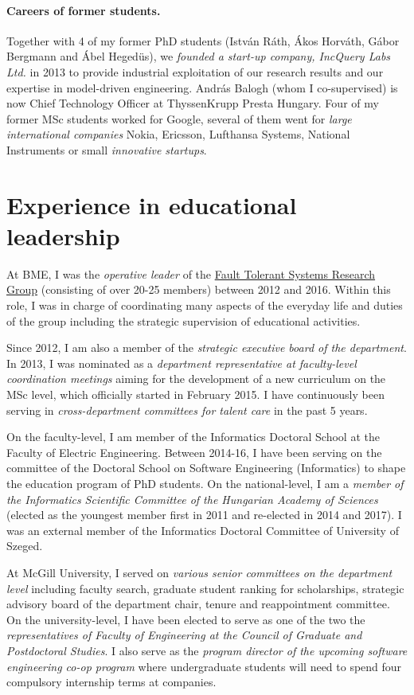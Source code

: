 \documentclass[a4paper,11pt]{article}
\begin{document}
\paragraph{Careers of former students.} Together with 4 of my former PhD students (István Ráth, Ákos Horváth, Gábor Bergmann and Ábel Hegedüs), we \emph{founded a start-up company, IncQuery Labs Ltd.} in 2013 to provide industrial exploitation of our research results and our expertise in model-driven engineering. András Balogh (whom I co-supervised) is now Chief Technology Officer at ThyssenKrupp Presta Hungary. Four of my former MSc students worked for Google, several of them went for \emph{large international companies} Nokia, Ericsson, Lufthansa Systems, National Instruments or small \emph{innovative startups}.

\section{Experience in educational leadership}
At BME, I was the \emph{operative leader} of the \href{http://inf.mit.bme.hu/en/}{Fault Tolerant Systems Research Group} (consisting of over 20-25 members) between 2012 and 2016. Within this role, I was in charge of coordinating many aspects of the everyday life and duties of the group including the strategic supervision of educational activities. 

Since 2012, I am also a member of the \emph{strategic executive board of the department}. In 2013, I was nominated as a \emph{department representative at faculty-level coordination meetings} aiming for the development of a new curriculum on the MSc level, which officially started in February 2015. I have continuously been serving in \emph{cross-department committees for talent care} in the past 5 years. 

On the faculty-level, I am member of the Informatics Doctoral School at the Faculty of Electric Engineering. Between 2014-16, I have been serving on the committee of the Doctoral School on Software Engineering (Informatics) to shape the education program of PhD students. On the national-level, I am a \emph{member of the Informatics Scientific Committee of the Hungarian Academy of Sciences} (elected as the youngest member first in 2011 and re-elected in 2014 and 2017). I was an external member of the Informatics Doctoral Committee of University of Szeged.

At McGill University, I served on \emph{various senior committees on the department level} including faculty search, graduate student ranking for scholarships, strategic advisory board of the department chair, tenure and reappointment committee. On the university-level, I have been elected to serve as one of the two the \emph{representatives of Faculty of Engineering at the Council of Graduate and Postdoctoral Studies}. I also serve as the \emph{program director of the upcoming software engineering co-op program } where undergraduate students will need to spend four compulsory internship terms at companies.
\end{document}
